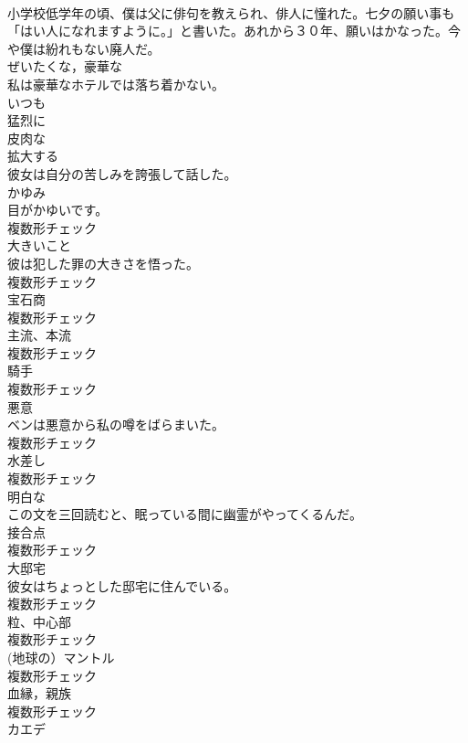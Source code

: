 \documentclass[8pt]{extreport}
\begin{document}
\begin{CJK}{UTF8}{min}
\\	小学校低学年の頃、僕は父に俳句を教えられ、俳人に憧れた。七夕の願い事も「はい人になれますように。」と書いた。あれから３０年、願いはかなった。今や僕は紛れもない廃人だ。	
\\	[形容詞]	ぜいたくな，豪華な	
\\	私は豪華なホテルでは落ち着かない。	
\\	[形容詞]	いつも	
\\	[副詞]	猛烈に	
\\	[形容詞]	皮肉な	
\\	[動詞]	拡大する	
\\	彼女は自分の苦しみを誇張して話した。	
\\	[名詞]	かゆみ	
\\	目がかゆいです。	
\\	複数形チェック
\\	[名詞]	大きいこと	
\\	彼は犯した罪の大きさを悟った。	
\\	複数形チェック
\\	[名詞]	宝石商	
\\	複数形チェック
\\	[名詞]	主流、本流	
\\	複数形チェック
\\	[名詞]	騎手	
\\	複数形チェック
\\	[名詞]	悪意	
\\	ベンは悪意から私の噂をばらまいた。	
\\	複数形チェック
\\	[名詞]	水差し	
\\	複数形チェック
\\	[形容詞]	明白な	
\\	この文を三回読むと、眠っている間に幽霊がやってくるんだ。	
\\	[名詞]	接合点	
\\	複数形チェック
\\	[名詞]	大邸宅	
\\	彼女はちょっとした邸宅に住んでいる。	
\\	複数形チェック
\\	[名詞]	粒、中心部	
\\	複数形チェック
\\	[名詞]	(地球の）マントル	
\\	複数形チェック
\\	[名詞]	血縁，親族	
\\	複数形チェック
\\	[名詞]	カエデ	

\end{CJK}
\end{document}
